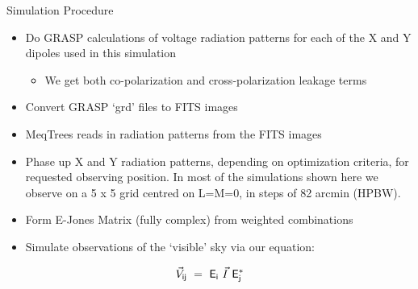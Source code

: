 \documentclass[pdf,azure,slideColor,colorBG]{prosper}
\begin{document}
\begin{slide}{Simulation Procedure}
\begin{small}
\begin{itemize}
\item Do GRASP calculations of voltage radiation patterns for each of the 
X and Y dipoles used in this simulation
\begin {itemize}
\item We get both co-polarization and cross-polarization leakage terms
\end{itemize}
\item Convert GRASP `grd' files to FITS images
\item MeqTrees reads in radiation patterns from the FITS images
\item Phase up X and Y radiation patterns, depending on optimization criteria,
for requested observing position. In most of the simulations shown here 
we observe on a 5 x 5 grid centred on L=M=0, in steps of 82 arcmin (HPBW). 
\item Form E-Jones Matrix (fully complex) from weighted combinations
\item Simulate observations of the `visible' sky via our equation:
\end{itemize}
\begin{displaymath}
  {\vec{V}}_{{\sf i}{\sf j}} 
  ~= 
  ~{\sf E}_{{\sf i}}
  ~{\vec{I}}
  ~{\sf E}_{{\sf j}}^\ast
\end{displaymath}
\end {small}
\end{slide}
\end{document}
